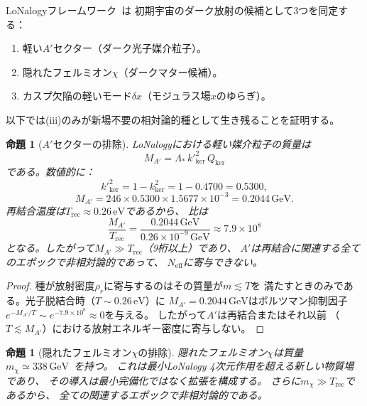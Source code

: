 \documentclass[12pt]{article}
\theoremstyle{plain}
\newtheorem{proposition}[theorem]{命題}
\theoremstyle{definition}
\numberwithin{equation}{section}
\newcommand{\kker}{\mathrm{ker}}
\newcommand{\eff}{\mathrm{eff}}
\begin{document}
LoNalogyフレームワーク~\cite{LoNalogyv87,ParticleCosmo}は
初期宇宙のダーク放射の候補として3つを同定する：

\begin{enumerate}[label=(\roman*)]
\item 軽い$A'$セクター（ダーク光子媒介粒子）。
\item 隠れたフェルミオン$\chi$（ダークマター候補）。
\item カスプ欠陥の軽いモード$\delta x$（モジュラス場$x$のゆらぎ）。
\end{enumerate}

以下では(iii)のみが新場不要の相対論的種として生き残ることを証明する。

\begin{proposition}[$A'$セクターの排除]\label{prop:excA}
LoNalogyにおける軽い媒介粒子の質量は
\begin{equation}
M_{A'} = \Lambda_*\,k'^2_{\kker}\,Q_{\kker}
\end{equation}
である。数値的に：
\begin{equation}
k'^2_{\kker} = 1-k_{\kker}^2 = 1-0.4700 = 0.5300,
\end{equation}
\begin{equation}
M_{A'} = 246\times0.5300\times1.5677\times10^{-3} = 0.2044\,\mathrm{GeV}.
\end{equation}
再結合温度は$T_{\mathrm{rec}}\approx0.26\,\mathrm{eV}$であるから、
比は
\begin{equation}
\frac{M_{A'}}{T_{\mathrm{rec}}} = \frac{0.2044\,\mathrm{GeV}}{0.26\times10^{-9}\,\mathrm{GeV}}
\approx 7.9\times10^{8}
\end{equation}
となる。したがって$M_{A'}\gg T_{\mathrm{rec}}$（9桁以上）であり、
$A'$は再結合に関連する全てのエポックで非相対論的であって、
$N_{\eff}$に寄与できない。
\end{proposition}

\begin{proof}
種が放射密度$\rho_r$に寄与するのはその質量が$m\lesssim T$を
満たすときのみである。光子脱結合時（$T\sim0.26\,\mathrm{eV}$）に
$M_{A'}=0.2044\,\mathrm{GeV}$はボルツマン抑制因子
$e^{-M_{A'}/T}\sim e^{-7.9\times10^8}\approx 0$を与える。
したがって$A'$は再結合またはそれ以前
（$T\lesssim M_{A'}$）における放射エネルギー密度に寄与しない。
\end{proof}

\begin{proposition}[隠れたフェルミオン$\chi$の排除]\label{prop:excchi}
隠れたフェルミオン$\chi$は質量
$m_\chi\simeq338\,\mathrm{GeV}$~\cite{ParticleCosmo}を持つ。
これは最小LoNalogy 4次元作用を超える新しい物質場であり、
その導入は最小完備化ではなく拡張を構成する。
さらに$m_\chi\gg T_{\mathrm{rec}}$であるから、
全ての関連するエポックで非相対論的である。
\end{proposition}
\end{document}
